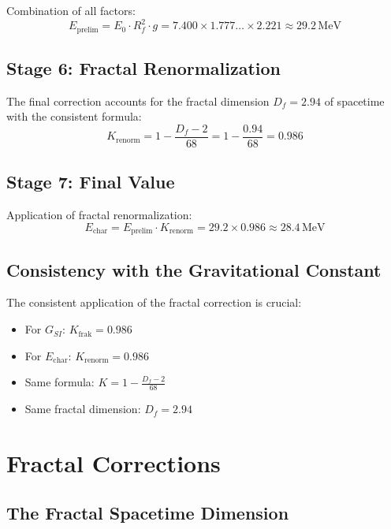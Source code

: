 \documentclass[12pt,a4paper]{article}
\begin{document}
	Combination of all factors:
	\begin{equation}
		E_{\text{prelim}} = E_0 \cdot R_f^2 \cdot g = 7.400 \times 1.777\ldots \times 2.221 \approx 29.2\,\text{MeV}
	\end{equation}
	
	\subsection{Stage 6: Fractal Renormalization}
	
	The final correction accounts for the fractal dimension $D_f = 2.94$ of spacetime with the consistent formula:
	\begin{equation}
		K_{\text{renorm}} = 1 - \frac{D_f - 2}{68} = 1 - \frac{0.94}{68} = 0.986
	\end{equation}
	
	\subsection{Stage 7: Final Value}
	
	Application of fractal renormalization:
	\begin{equation}
		E_{\text{char}} = E_{\text{prelim}} \cdot K_{\text{renorm}} = 29.2 \times 0.986 \approx 28.4\,\text{MeV}
	\end{equation}
	
	\subsection{Consistency with the Gravitational Constant}
	
	The consistent application of the fractal correction is crucial:
	\begin{itemize}
		\item For $G_{SI}$: $K_{\text{frak}} = 0.986$
		\item For $E_{\text{char}}$: $K_{\text{renorm}} = 0.986$
		\item Same formula: $K = 1 - \frac{D_f - 2}{68}$
		\item Same fractal dimension: $D_f = 2.94$
	\end{itemize}
	
	\section{Fractal Corrections}
	
	\subsection{The Fractal Spacetime Dimension}
	
\end{document}
